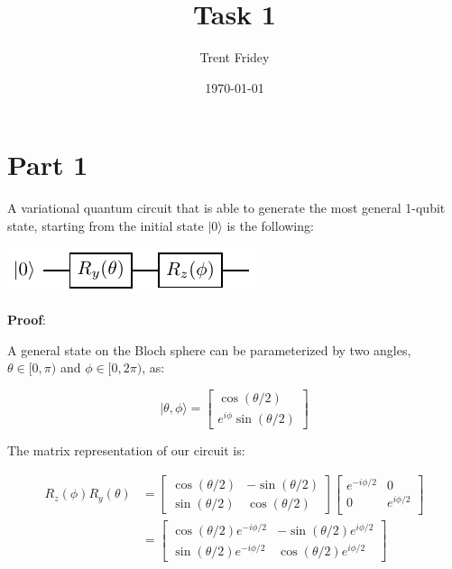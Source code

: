 \documentclass[11pt]{article}
\author{Trent Fridey}
\date{\today}
\title{Task 1}
\begin{document}
\maketitle
\tableofcontents

\pagebreak

\section{Part 1}
\label{sec:org1d227ca}

A variational quantum circuit that is able to generate the most general 1-qubit state, starting from the initial state \(|0\rangle\) is the following:

\begin{center}
\includegraphics[width=.9\linewidth]{circuits/variational/variational.pdf}
\end{center}

\textbf{\textbf{Proof}}:

A general state on the Bloch sphere can be parameterized by two angles, \(\theta \in [0,\pi)\) and \(\phi \in [0,2\pi)\), as:

\begin{equation*}
| \theta, \phi \rangle =
\begin{bmatrix}
\cos(\theta/2) \\
e^{i\phi}\sin(\theta/2)
\end{bmatrix}
\end{equation*}


The matrix representation of our circuit is:

\begin{align*}
R_z(\phi)R_y(\theta) &= 
\begin{bmatrix}
\cos(\theta/2) & -\sin(\theta/2) \\
\sin(\theta/2) & \cos(\theta/2)
\end{bmatrix}
\begin{bmatrix}
e^{-i\phi/2} & 0 \\
0 & e^{i\phi/2}  \\
\end{bmatrix} \\
&=
\begin{bmatrix}
\cos(\theta/2)e^{-i\phi/2} & -\sin(\theta/2)e^{i\phi/2} \\
\sin(\theta/2)e^{-i\phi/2} & \cos(\theta/2)e^{i\phi/2}
\end{bmatrix}
\end{align*}
\end{document}
